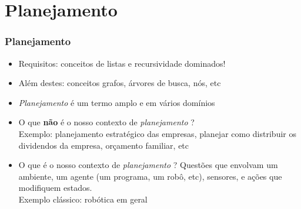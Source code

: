 \section{Planejamento}
\begin{frame}[fragile]

    \frametitle{Planejamento}

   \begin{block}{}
     \begin{itemize}
      \item Requisitos: conceitos de listas e recursividade  dominados!
       \pause
      
      \item Além destes: conceitos grafos, árvores de busca, nós, etc
       
       \pause
      \item \textit{Planejamento} é um termo amplo e em vários domínios 
      
       \pause
      \item O que \textbf{não} é o nosso contexto de \textit{planejamento} ?\\
      Exemplo: planejamento estratégico das empresas, planejar como distribuir
      os dividendos da empresa, orçamento familiar,  etc
      
      \pause
      
      
      \item O que é o nosso contexto de \textit{planejamento} ?
       \pause
       Questões que envolvam um ambiente, um agente (um programa, um robô, etc), sensores,
      e ações que modifiquem estados.\\ Exemplo clássico:  robótica em geral
 

    \end{itemize}
    
    \end{block}
    
\end{frame}



